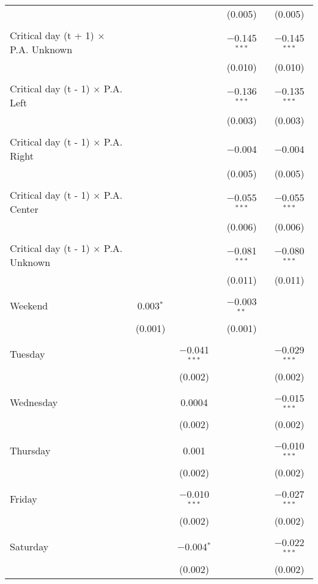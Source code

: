\documentclass[
]{article}
\begin{document}
\begin{table}[!htbp]
{\begin{tabular}{@{\extracolsep{5pt}}lcccc}
  &  &  & (0.005) & (0.005) \\ 
  & & & & \\ 
 Critical day (t + 1) $\times$ P.A. Unknown &  &  & $-$0.145$^{***}$ & $-$0.145$^{***}$ \\ 
  &  &  & (0.010) & (0.010) \\ 
  & & & & \\ 
 Critical day (t - 1) $\times$ P.A. Left &  &  & $-$0.136$^{***}$ & $-$0.135$^{***}$ \\ 
  &  &  & (0.003) & (0.003) \\ 
  & & & & \\ 
 Critical day (t - 1) $\times$ P.A. Right &  &  & $-$0.004 & $-$0.004 \\ 
  &  &  & (0.005) & (0.005) \\ 
  & & & & \\ 
 Critical day (t - 1) $\times$ P.A. Center &  &  & $-$0.055$^{***}$ & $-$0.055$^{***}$ \\ 
  &  &  & (0.006) & (0.006) \\ 
  & & & & \\ 
 Critical day (t - 1) $\times$ P.A. Unknown &  &  & $-$0.081$^{***}$ & $-$0.080$^{***}$ \\ 
  &  &  & (0.011) & (0.011) \\ 
  & & & & \\ 
 Weekend & 0.003$^{*}$ &  & $-$0.003$^{**}$ &  \\ 
  & (0.001) &  & (0.001) &  \\ 
  & & & & \\ 
 Tuesday &  & $-$0.041$^{***}$ &  & $-$0.029$^{***}$ \\ 
  &  & (0.002) &  & (0.002) \\ 
  & & & & \\ 
 Wednesday &  & 0.0004 &  & $-$0.015$^{***}$ \\ 
  &  & (0.002) &  & (0.002) \\ 
  & & & & \\ 
 Thursday &  & 0.001 &  & $-$0.010$^{***}$ \\ 
  &  & (0.002) &  & (0.002) \\ 
  & & & & \\ 
 Friday &  & $-$0.010$^{***}$ &  & $-$0.027$^{***}$ \\ 
  &  & (0.002) &  & (0.002) \\ 
  & & & & \\ 
 Saturday &  & $-$0.004$^{*}$ &  & $-$0.022$^{***}$ \\ 
  &  & (0.002) &  & (0.002) \\ 

\end{tabular}}
\end{table}
\end{document}
